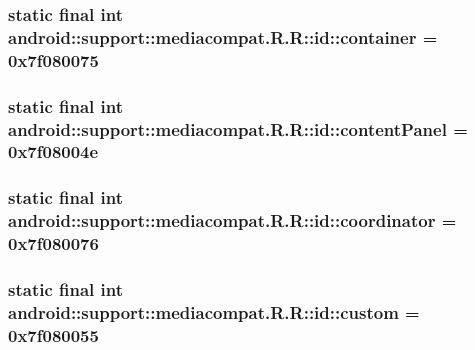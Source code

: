 \hypertarget{classandroid_1_1support_1_1mediacompat_1_1_r_1_1id_aed36d3a45aea8375ab40da069ab5e47}{
\subsubsection[{container}]{\setlength{\rightskip}{0pt plus 5cm}static final int android::support::mediacompat.R.R::id::container = 0x7f080075}}
\label{classandroid_1_1support_1_1mediacompat_1_1_r_1_1id_aed36d3a45aea8375ab40da069ab5e47}


\hypertarget{classandroid_1_1support_1_1mediacompat_1_1_r_1_1id_8a1c1f4e2ad32e8827270b80f270ed14}{
\subsubsection[{contentPanel}]{\setlength{\rightskip}{0pt plus 5cm}static final int android::support::mediacompat.R.R::id::contentPanel = 0x7f08004e}}
\label{classandroid_1_1support_1_1mediacompat_1_1_r_1_1id_8a1c1f4e2ad32e8827270b80f270ed14}


\hypertarget{classandroid_1_1support_1_1mediacompat_1_1_r_1_1id_b1949aee42755e077af8a33696d01bbf}{
\subsubsection[{coordinator}]{\setlength{\rightskip}{0pt plus 5cm}static final int android::support::mediacompat.R.R::id::coordinator = 0x7f080076}}
\label{classandroid_1_1support_1_1mediacompat_1_1_r_1_1id_b1949aee42755e077af8a33696d01bbf}


\hypertarget{classandroid_1_1support_1_1mediacompat_1_1_r_1_1id_7c3ac8755cd24a479ee781bf41372f71}{
\subsubsection[{custom}]{\setlength{\rightskip}{0pt plus 5cm}static final int android::support::mediacompat.R.R::id::custom = 0x7f080055}}
\label{classandroid_1_1support_1_1mediacompat_1_1_r_1_1id_7c3ac8755cd24a479ee781bf41372f71}


